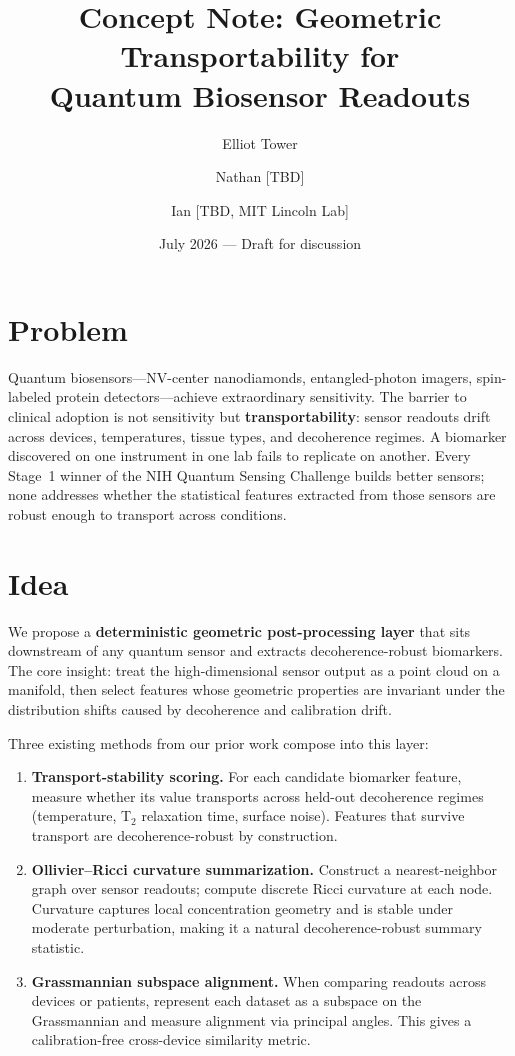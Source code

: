 \documentclass[11pt]{article}
\title{Concept Note: Geometric Transportability for\\Quantum Biosensor Readouts}
\author{Elliot Tower \and Nathan [TBD] \and Ian [TBD, MIT Lincoln Lab]}
\date{July 2026 --- Draft for discussion}
\begin{document}
\maketitle
\thispagestyle{empty}

\section*{Problem}

Quantum biosensors---NV-center nanodiamonds, entangled-photon imagers,
spin-labeled protein detectors---achieve extraordinary sensitivity.
The barrier to clinical adoption is not sensitivity but
\textbf{transportability}: sensor readouts drift across devices,
temperatures, tissue types, and decoherence regimes.  A biomarker
discovered on one instrument in one lab fails to replicate on another.
Every Stage~1 winner of the NIH Quantum Sensing Challenge builds
better sensors; none addresses whether the statistical features
extracted from those sensors are robust enough to transport across
conditions.

\section*{Idea}

We propose a \textbf{deterministic geometric post-processing layer}
that sits downstream of any quantum sensor and extracts
decoherence-robust biomarkers.  The core insight: treat the
high-dimensional sensor output as a point cloud on a manifold, then
select features whose geometric properties are invariant under the
distribution shifts caused by decoherence and calibration drift.

Three existing methods from our prior work compose into this layer:

\begin{enumerate}
  \item \textbf{Transport-stability scoring.}  For each candidate
    biomarker feature, measure whether its value transports across
    held-out decoherence regimes (temperature, T$_2$ relaxation time,
    surface noise).  Features that survive transport are
    decoherence-robust by construction.

  \item \textbf{Ollivier--Ricci curvature summarization.}  Construct a
    nearest-neighbor graph over sensor readouts; compute discrete
    Ricci curvature at each node.  Curvature captures local
    concentration geometry and is stable under moderate perturbation,
    making it a natural decoherence-robust summary statistic.

  \item \textbf{Grassmannian subspace alignment.}  When comparing
    readouts across devices or patients, represent each dataset as a
    subspace on the Grassmannian and measure alignment via principal
    angles.  This gives a calibration-free cross-device similarity
    metric.
\end{enumerate}
\end{document}
